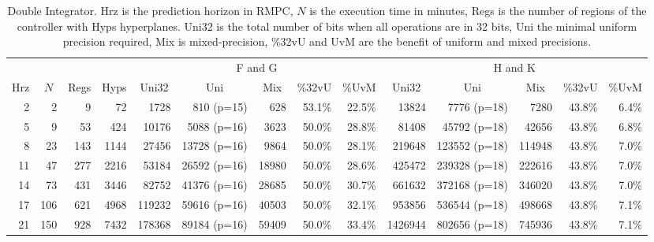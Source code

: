 \begin{table*}[p]
  \centering
  \caption{Double Integrator.\textmd{ Hrz is the prediction horizon in RMPC, $N$ is the execution time in minutes, Regs is the number of regions of the controller with Hyps hyperplanes. Uni32 is the total number of bits when all operations are in 32 bits, Uni the minimal uniform precision required, Mix is mixed-precision, \%32vU and UvM are the benefit of uniform and mixed precisions.}}
  \label{tab:di}
  \renewcommand{\arraystretch}{1.2}
  \setlength{\tabcolsep}{0.5em} %
  \begin{tabular}{rrrr|rrrrr|rrrrr}
    \toprule
    \multicolumn{4}{c}{} & \multicolumn{5}{|c|}{F and G} & \multicolumn{5}{c}{H and K} \\
    \multicolumn{1}{c}{Hrz}&
    \multicolumn{1}{c}{$N$}&
    \multicolumn{1}{c}{Regs} &
    \multicolumn{1}{c}{Hyps} &
    \multicolumn{1}{|c}{Uni32}&
    \multicolumn{1}{c}{Uni}&
    \multicolumn{1}{c}{Mix}&
    \multicolumn{1}{c}{\%32vU}&
    \multicolumn{1}{c}{\%UvM}&
    \multicolumn{1}{|c}{Uni32}&
    \multicolumn{1}{c}{Uni}&
    \multicolumn{1}{c}{Mix}&
    \multicolumn{1}{c}{\%32vU}&
    \multicolumn{1}{c}{\%UvM} \\
    \midrule
    2 & 2 & 9 & 72 & 1728 & 810 (p=15) & 628 & 53.1\% & 22.5\% & 13824 & 7776 (p=18) & 7280 & 43.8\%& 6.4\% \\
    5 & 9 & 53 & 424 & 10176 & 5088 (p=16) & 3623 & 50.0\% & 28.8\% & 81408 & 45792 (p=18) & 42656 & 43.8\% & 6.8\% \\
    8 & 23 & 143 & 1144 & 27456 & 13728 (p=16) & 9864 & 50.0\%  & 28.1\% & 219648 & 123552 (p=18) & 114948 & 43.8\% & 7.0\% \\
    11 & 47 & 277 & 2216 & 53184 & 26592 (p=16) & 18980 & 50.0\% & 28.6\% & 425472 & 239328 (p=18) & 222616 & 43.8\% & 7.0\% \\
    
    14 & 73 & 431& 3446& 82752& 41376 (p=16)& 28685& 50.0\% & 30.7\% & 661632& 372168 (p=18)& 346020& 43.8\% &7.0\% \\
    
    17 & 106 & 621 & 4968 & 119232 & 59616 (p=16) & 40503 & 50.0\% & 32.1\% & 953856& 536544 (p=18)& 498668& 43.8\% & 7.1\% \\
    
    21 & 150 & 928 & 7432 & 178368 & 89184 (p=16) & 59409 & 50.0\% & 33.4\% & 1426944 & 802656 (p=18) & 745936 & 43.8\% & 7.1\%  \\
    

\end{tabular}
\end{table*}
